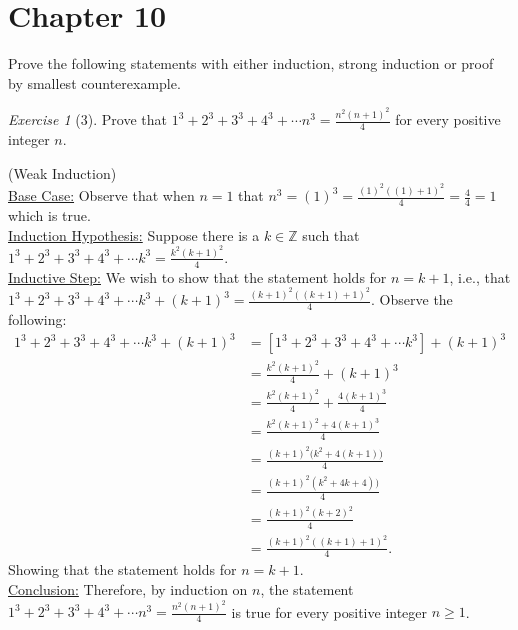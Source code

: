 \documentclass[12pt]{amsart}
\makeatletter
\theoremstyle{remark}
\newtheorem*{exercise}{Exercise}%
\def\ZZ{\ensuremath{\mathbb Z}}
\renewenvironment{proof}[1][\proofname]{\par\doublespacing
  \pushQED{\qed}%
  \normalfont \topsep6\p@\@plus6\p@\relax
  \list{}{%
    \settowidth{\leftmargin}{\itshape\proofname:\hskip\labelsep}%
    \setlength{\labelwidth}{0pt}%
    \setlength{\itemindent}{-\leftmargin}%
  }%
  \item[\hskip\labelsep\itshape#1\@addpunct{:}]\ignorespaces
}{%
  \popQED\endlist\@endpefalse
  \singlespacing
}
\theoremstyle{mycomment}
\makeatother
\begin{document}
\thispagestyle{fancy}

\section*{Chapter 10} Prove the following statements with either induction, strong induction or proof by smallest counterexample.


\begin{exercise}[3] Prove that $1^{3}+2^{3}+3^{3}+4^{3}+\cdots n^{3}=\frac{n^{2}(n+1)^{2}}{4}$ for every positive integer $n$.
\begin{proof}%
  (Weak Induction)\\ \underline{Base Case:} Observe that when $n = 1$ that $ n^3 = (1)^3 = \frac{(1)^{2}{((1)+1)^{2}}}{4} = \frac{4}{4} = 1$ which is true. \\
  \underline{Induction Hypothesis:} Suppose there is a $k \in \ZZ$ such that $1^{3}+2^{3}+3^{3}+4^{3}+\cdots k^{3}=\frac{k^{2}(k+1)^{2}}{4}$. \\
  \underline{Inductive Step:} We wish to show that the statement holds for $n = k+1$, i.e., that $1^{3}+2^{3}+3^{3}+4^{3}+\cdots k^{3} + (k + 1)^3 =\frac{(k+1)^2 ((k+1)+1)^2}{4}$. Observe the following:
  \begin{align*}
    1^{3}+2^{3}+3^{3}+4^{3}+\cdots k^{3} + (k + 1)^3 &= [1^{3}+2^{3}+3^{3}+4^{3}+\cdots k^{3}]+ (k + 1)^3 \\ 
                                                     &= \frac{k^{2}(k+1)^{2}}{4} + (k + 1)^3  \\
                                                     &= \frac{k^{2}(k+1)^{2}}{4} + \frac{4(k + 1)^3}{4} \\
                                                     &= \frac{k^{2}(k+1)^{2}+{4(k + 1)^3}}{4} \\
                                                     &= \frac{(k+1)^{2}(k^2+{4(k + 1))}}{4} \\
                                                     &= \frac{(k+1)^{2}(k^2+4k + 4))}{4} \\
                                                     &= \frac{(k+1)^2 (k+2)^2}{4} \\
                                                     &= \frac{(k+1)^2 ((k+1)+1)^2}{4}.
  \end{align*}
  Showing that the statement holds for $n = k + 1$. \\
  \underline{Conclusion:} Therefore, by induction on $n$, the statement $1^{3}+2^{3}+3^{3}+4^{3}+\cdots n^{3}=\frac{n^{2}(n+1)^{2}}{4}$ is true for every positive integer $n \geq 1$.
\end{proof}
\end{exercise}
\end{document}
